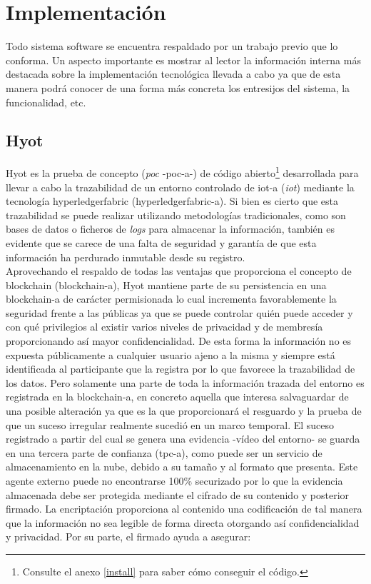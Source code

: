 \documentclass[12pt,a4paper, twoside]{report}
\begin{document}
	\chapter{Implementación} \label{implementationChapter}
	
	Todo sistema software se encuentra respaldado por un trabajo previo que lo conforma. Un aspecto importante es mostrar al lector la información interna más destacada sobre la implementación tecnológica llevada a cabo ya que de esta manera podrá conocer de una forma más concreta los entresijos del sistema, la funcionalidad, etc.
	
	\section{Hyot}
		
	Hyot es la prueba de concepto (\textit{\gls{poc}} -\gls{poc-a}-) de código abierto\footnote{Consulte el anexo \ref{install} para saber cómo conseguir el código.} desarrollada para llevar a cabo la trazabilidad de un entorno controlado de \gls{iot-a} (\textit{\gls{iot}}) mediante la tecnología \gls{hyperledgerfabric} (\gls{hyperledgerfabric-a}). Si bien es cierto que esta trazabilidad se puede realizar utilizando metodologías tradicionales, como son bases de datos o ficheros de \textit{logs} para almacenar la información, también es evidente que se carece de una falta de seguridad y garantía de que esta información ha perdurado inmutable desde su registro. \\
				
	Aprovechando el respaldo de todas las ventajas que proporciona el concepto de \Gls{blockchain} (\gls{blockchain-a}), Hyot mantiene parte de su persistencia en una \gls{blockchain-a} de carácter permisionada lo cual incrementa favorablemente la seguridad frente a las públicas ya que se puede controlar quién puede acceder y con qué privilegios al existir varios niveles de privacidad y de membresía proporcionando así mayor confidencialidad. De esta forma la información no es expuesta públicamente a cualquier usuario ajeno a la misma y siempre está identificada al participante que la registra por lo que favorece la trazabilidad de los datos. Pero solamente una parte de toda la información trazada del entorno es registrada en la \gls{blockchain-a}, en concreto aquella que interesa salvaguardar de una posible alteración ya que es la que proporcionará el resguardo y la prueba de que un suceso irregular realmente sucedió en un marco temporal. El suceso registrado a partir del cual se genera una evidencia -vídeo del entorno- se guarda en una tercera parte de confianza (\gls{tpc-a}), como puede ser un servicio de almacenamiento en la nube, debido a su tamaño y al formato que presenta. Este agente externo puede no encontrarse 100\% securizado por lo que la evidencia almacenada debe ser protegida mediante el cifrado de su contenido y posterior firmado. La encriptación proporciona al contenido una codificación de tal manera que la información no sea legible de forma directa otorgando así confidencialidad y privacidad. Por su parte, el firmado ayuda a asegurar:
		
\end{document}
